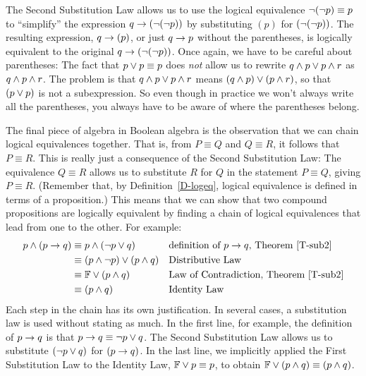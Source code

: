 The Second Substitution Law allows us to use the 
logical equivalence $\lnot(\lnot p)\equiv p$ to
``simplify'' the expression $q\rightarrow (\lnot(\lnot p))$ by substituting
$(p)$ for $(\lnot(\lnot p))$.  The resulting expression, $q\rightarrow(p)$,
or just $q \rightarrow p$ without the parentheses,
is logically equivalent to the original $q\rightarrow (\lnot(\lnot p))$.
Once again, we have to be careful about parentheses:  The fact that
$p\vee p\equiv p$ does \emph{not} allow us to rewrite $q\wedge p\vee p\wedge r$
as $q\wedge p\wedge r$.  The problem is that $q\wedge p\vee p\wedge r$
means $(q\wedge p)\vee (p\wedge r)$, so that $(p\vee p)$ is not a subexpression.
So even though in practice we won't always write all the parentheses,
you always have to be aware of where the parentheses belong.


The final piece of algebra in Boolean algebra is the observation
that we can chain logical equivalences together.  That is,
from $P\equiv Q$ and $Q\equiv R$, it follows that $P\equiv R$.
This is really just a consequence of the Second Substitution
Law: The equivalence $Q\equiv R$ allows us to substitute $R$ for $Q$ in
the statement $P\equiv Q$, giving $P\equiv R$.
(Remember that, by Definition~\ref{D-logeq}, logical equivalence is defined in 
terms of a proposition.)
This means that we can show that two compound propositions are
logically equivalent by finding a chain of logical equivalences that
lead from one to the other.  For example:
\begin{align*}
 p\wedge(p\rightarrow q) &\equiv p\wedge(\lnot p\vee q)          &&\text{definition of $p\rightarrow q$, Theorem \ref{T-sub2}}\\
                &\equiv (p\wedge \lnot p)\vee (p\wedge q) &&\text{Distributive Law}\\ 
                &\equiv \mathbb{F}\vee(p\wedge q)              &&\text{Law of Contradiction, Theorem \ref{T-sub2}}\\
                &\equiv (p\wedge q)                   &&\text{Identity Law}\\
\end{align*}
Each step in the chain has its own justification.  In several cases,
a substitution law is used without stating as much.  In the first line,
for example, the definition of $p\rightarrow q$ is that $p\rightarrow q\equiv \lnot p\vee q$.
The Second Substitution Law allows us to substitute $(\lnot p\vee q)$ for
$(p\rightarrow q)$.  In the last line, we implicitly applied the First
Substitution Law to the Identity Law, $\mathbb{F}\vee p\equiv p$, to obtain
$\mathbb{F}\vee(p\wedge q)\equiv (p\wedge q)$.  

